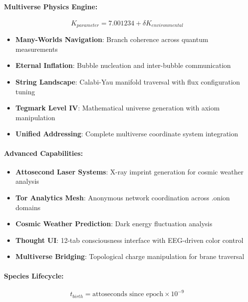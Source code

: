 \documentclass[11pt,a4paper]{article}
\begin{document}
\paragraph{Multiverse Physics Engine:}
\begin{equation}
K_{parameter} = 7.001234 + \delta K_{environmental}
\end{equation}

\begin{itemize}
    \item \textbf{Many-Worlds Navigation}: Branch coherence across quantum measurements
    \item \textbf{Eternal Inflation}: Bubble nucleation and inter-bubble communication  
    \item \textbf{String Landscape}: Calabi-Yau manifold traversal with flux configuration tuning
    \item \textbf{Tegmark Level IV}: Mathematical universe generation with axiom manipulation
    \item \textbf{Unified Addressing}: Complete multiverse coordinate system integration
\end{itemize}

\paragraph{Advanced Capabilities:}
\begin{itemize}
    \item \textbf{Attosecond Laser Systems}: X-ray imprint generation for cosmic weather analysis
    \item \textbf{Tor Analytics Mesh}: Anonymous network coordination across .onion domains
    \item \textbf{Cosmic Weather Prediction}: Dark energy fluctuation analysis
    \item \textbf{Thought UI}: 12-tab consciousness interface with EEG-driven color control
    \item \textbf{Multiverse Bridging}: Topological charge manipulation for brane traversal
\end{itemize}

\paragraph{Species Lifecycle:}
\begin{equation}
t_{birth} = \text{attoseconds since epoch} \times 10^{-9}
\end{equation}
\end{document}
